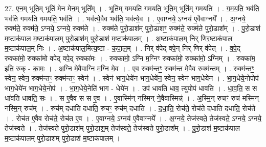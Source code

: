 \documentclass[17pt]{extarticle}
\begin{document}
27. ए॒न॒म् भूति॒म् भूति॑ मेन मेन॒म् भूति᳚म् । . भूति॑म् गमयति गमयति॒ भूति॒म् भूति॑म् गमयति । . ग॒म॒य॒ति॒ भव॑ति॒ भव॑ति गमयति गमयति॒ भव॑ति । . भव॑त्ये॒वैव भव॑ति॒ भव॑त्ये॒व । . ए॒वाग्नये॒ ऽग्नय॑ ए॒वैवाग्नये᳚ । . अ॒ग्नये॒ रुक्म॑ते॒ रुक्म॑ते॒ ऽग्नये॒ ऽग्नये॒ रुक्म॑ते । . रुक्म॑ते पुरो॒डाश॑म् पुरो॒डाशꣳ॒॒ रुक्म॑ते॒ रुक्म॑ते पुरो॒डाश᳚म् । . पु॒रो॒डाश॑ म॒ष्टाक॑पाल म॒ष्टाक॑पालम् पुरो॒डाश॑म् पुरो॒डाश॑ म॒ष्टाक॑पालम् । . अ॒ष्टाक॑पाल॒म् निर् णिर॒ष्टाक॑पाल म॒ष्टाक॑पाल॒म् निः । . अ॒ष्टाक॑पाल॒मित्य॒ष्टा - क॒पा॒ल॒म् । . निर् व॑पेद् वपे॒न् निर् णिर् व॑पेत् । . व॒पे॒द् रुक्का॑मो॒ रुक्का॑मो वपेद् वपे॒द् रुक्का॑मः । . रुक्का॑मो॒ ऽग्नि म॒ग्निꣳ रुक्का॑मो॒ रुक्का॑मो॒ ऽग्निम् । . रुक्का॑म॒ इति॒ रुक् - का॒मः॒ । . अ॒ग्नि मे॒वैवाग्नि म॒ग्नि मे॒व । . ए॒व रुक्म॑न्तꣳ॒॒ रुक्म॑न्त मे॒वैव रुक्म॑न्तम् । . रुक्म॑न्तꣳ॒॒ स्वेन॒ स्वेन॒ रुक्म॑न्तꣳ॒॒ रुक्म॑न्तꣳ॒॒ स्वेन॑ । . स्वेन॑ भाग॒धेये॑न भाग॒धेये॑न॒ स्वेन॒ स्वेन॑ भाग॒धेये॑न । . भा॒ग॒धेये॒नोपोप॑ भाग॒धेये॑न भाग॒धेये॒नोप॑ । . भा॒ग॒धेये॒नेति॑ भाग - धेये॑न । . उप॑ धावति धाव॒ त्युपोप॑ धावति । . धा॒व॒ति॒ स स धा॑वति धावति॒ सः । . स ए॒वैव स स ए॒व । . ए॒वास्मि॑न् नस्मिन् ने॒वैवास्मिन्न्॑ । . अ॒स्मि॒न् रुचꣳ॒॒ रुच॑ मस्मिन् नस्मि॒न् रुच᳚म् । . रुच॑म् दधाति दधाति॒ रुचꣳ॒॒ रुच॑म् दधाति । . द॒धा॒ति॒ रोच॑ते॒ रोच॑ते दधाति दधाति॒ रोच॑ते । . रोच॑त ए॒वैव रोच॑ते॒ रोच॑त ए॒व । . ए॒वाग्नये॒ ऽग्नय॑ ए॒वैवाग्नये᳚ । . अ॒ग्नये॒ तेज॑स्वते॒ तेज॑स्वते॒ ऽग्नये॒ ऽग्नये॒ तेज॑स्वते । . तेज॑स्वते पुरो॒डाश॑म् पुरो॒डाश॒म् तेज॑स्वते॒ तेज॑स्वते पुरो॒डाश᳚म् । . पु॒रो॒डाश॑ म॒ष्टाक॑पाल म॒ष्टाक॑पालम् पुरो॒डाश॑म् पुरो॒डाश॑ म॒ष्टाक॑पालम् । \newline
\end{document}
